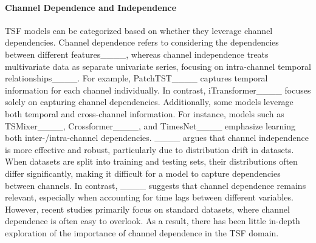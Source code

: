 \paragraph{\textbf{Channel Dependence and Independence}}
\label{sec:CDI}
TSF models can be categorized based on whether they leverage channel dependencies. Channel dependence refers to considering the dependencies between different features____, whereas channel independence treats multivariate data as separate univariate series, focusing on intra-channel temporal relationships____.
For example, PatchTST____ captures temporal information for each channel individually.
In contrast, iTransformer____ focuses solely on capturing channel dependencies. Additionally, some models leverage both temporal and cross-channel information.
For instance, models such as TSMixer____, Crossformer____, and TimesNet____ emphasize learning both inter-/intra-channel dependencies.
____ argues that channel independence is more effective and robust, particularly due to distribution drift in datasets. When datasets are split into training and testing sets, their distributions often differ significantly, making it difficult for a model to capture dependencies between channels.
In contrast, ____ suggests that channel dependence remains relevant, especially when accounting for time lags between different variables.
However, recent studies primarily focus on standard datasets, where channel dependence is often easy to overlook. As a result, there has been little in-depth exploration of the importance of channel dependence in the TSF domain.